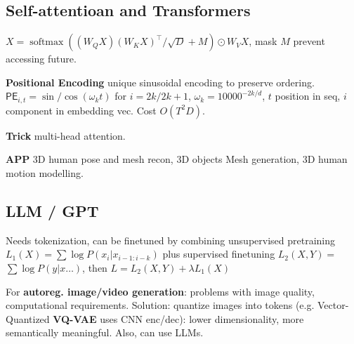 \subsection*{Self-attentioan and Transformers}

\(X=\operatorname{softmax}({({W}_{{Q}} {X})({W}_{{K}} {X})^{\top}}/{\sqrt{D}}+M) \odot {W}_{{V}} {X}\), mask \(M\) prevent accessing future. 

\textbf{Positional Encoding} unique sinusoidal encoding to preserve ordering. \(\mathsf{PE}_{i, t} =  \sin\text{/}\cos (\omega_{k} t)\) for \(i= 2k\text{/} 2k+1\), \(\omega_{k}=10000^{-{2 k}/{d}}\), \(t\) position in seq, \(i\) component in embedding vec.
Cost \(O(T^2 D)\).

\textbf{Trick} multi-head attention.

\textbf{APP} 3D human pose and mesh recon, 3D objects Mesh generation, 3D human motion modelling.

\subsection*{LLM / GPT}

Needs tokenization, can be finetuned by combining unsupervised pretraining $L_1(X) = \sum \log P(x_i|x_{i-1:i-k})$ plus supervised finetuning $L_2(X,Y) =$ $ \sum \log P(y|x\dots)$, then $L=L_2(X,Y) + \lambda L_1(X)$

For \textbf{autoreg. image/video generation}: problems with image quality, computational requirements. Solution: quantize images into tokens (e.g. Vector-Quantized \textbf{VQ-VAE} uses CNN enc/dec): lower dimensionality, more semantically meaningful. Also, can use LLMs.






